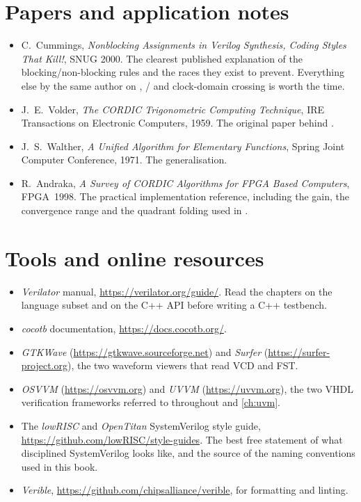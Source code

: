 \section*{Papers and application notes}

\begin{itemize}
  \item C.~Cummings, \emph{Nonblocking Assignments in Verilog Synthesis, Coding
        Styles That Kill!}, SNUG 2000. The clearest published explanation of
        the blocking/non-blocking rules and the races they exist to prevent.
        Everything else by the same author on ,
        / and clock-domain crossing is worth the
        time.
  \item J.~E.~Volder, \emph{The CORDIC Trigonometric Computing Technique},
        IRE Transactions on Electronic Computers, 1959. The original paper
        behind .
  \item J.~S.~Walther, \emph{A Unified Algorithm for Elementary Functions},
        Spring Joint Computer Conference, 1971. The generalisation.
  \item R.~Andraka, \emph{A Survey of CORDIC Algorithms for FPGA Based
        Computers}, FPGA~1998. The practical implementation reference,
        including the gain, the convergence range and the quadrant folding
        used in .
\end{itemize}

\section*{Tools and online resources}

\begin{itemize}
  \item \emph{Verilator} manual, \url{https://verilator.org/guide/}. Read the
        chapters on the language subset and on the C++ API before writing a
        C++ testbench.
  \item \emph{cocotb} documentation, \url{https://docs.cocotb.org/}.
  \item \emph{GTKWave} (\url{https://gtkwave.sourceforge.net}) and
        \emph{Surfer} (\url{https://surfer-project.org}), the two waveform
        viewers that read VCD and FST.
  \item \emph{OSVVM} (\url{https://osvvm.org}) and \emph{UVVM}
        (\url{https://uvvm.org}), the two VHDL verification frameworks
        referred to throughout  and \cref{ch:uvm}.
  \item The \emph{lowRISC} and \emph{OpenTitan} SystemVerilog style guide,
        \url{https://github.com/lowRISC/style-guides}. The best free
        statement of what disciplined SystemVerilog looks like, and the
        source of the naming conventions used in this book.
  \item \emph{Verible}, \url{https://github.com/chipsalliance/verible}, for
        formatting and linting.
\end{itemize}
